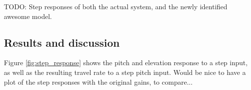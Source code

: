 TODO: Step responses of both the actual system, and the newly identified awesome model.

\subsection{Results and discussion}

Figure \ref{fig:step_response} shows the pitch and elevation response to a step input, as well as the resulting travel rate to a step pitch input.
Would be nice to have a plot of the step responses with the original gains, to compare...



